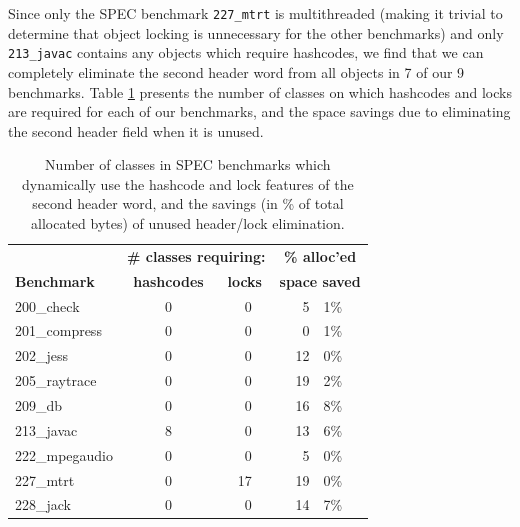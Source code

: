 \documentclass[preprint]{acmconf}
\begin{document}
Since only the SPEC benchmark {\tt 227\_mtrt} is multithreaded
(making it trivial to determine that object locking is unnecessary
for the other benchmarks)
and only {\tt 213\_javac} contains
any objects which require hashcodes, we find that we can completely
eliminate the second header word from all objects in 7 of our 9 benchmarks.
Table \ref{tab:hashlock-opt} presents the number of classes on which
hashcodes and locks are required for each of our benchmarks, and the
space savings due to eliminating the second header field when it is
unused.
\begin{table}
\begin{tabular}{lccr@{.}l}
&\multicolumn{2}{c}{\bf\# classes requiring:}&\multicolumn{2}{c}{\bf\% alloc'ed}\\
\bf Benchmark &\bf hashcodes&\bf locks&\multicolumn{2}{c}{\bf space saved}\\\hline
200\_check	&   0 &   ~0   &  5&1\% \\
201\_compress	&   0 &   ~0   &  0&1\% \\
202\_jess	&   0 &   ~0   & 12&0\% \\
205\_raytrace	&   0 &   ~0   & 19&2\% \\
209\_db 	&   0 &   ~0   & 16&8\% \\
213\_javac	&   8 &   ~0   & 13&6\% \\
222\_mpegaudio	&   0 &   ~0   &  5&0\% \\
227\_mtrt	&   0 &   17   & 19&0\% \\
228\_jack	&   0 &   ~0   & 14&7\% \\
\end{tabular}
\caption{Number of classes in SPEC benchmarks which dynamically use
  the hashcode and lock features of the second header word,
  and the savings (in \% of total allocated bytes) of unused header/lock
  elimination.}
\label{tab:hashlock-opt}
\end{table}
\end{document}
